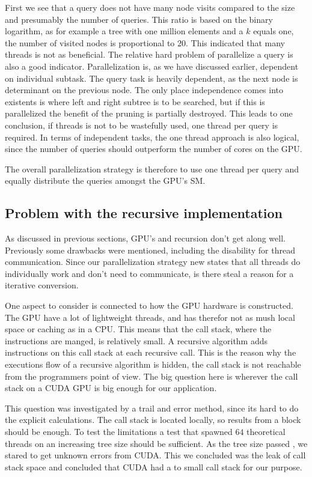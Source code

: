 First we see that a query does not have many node visits compared to the size and presumably the number of queries. This ratio is based on the binary logarithm, as for example a tree with one million elements and a $k$ equals one, the number of visited nodes is proportional to $20$. This indicated that many threads is not as beneficial. The relative hard problem of parallelize a query is also a good indicator. Parallelization is, as we have discussed earlier, dependent on individual subtask. The query task is heavily dependent, as the next node is determinant on the previous node. The only place independence comes into existents is where left and right subtree is to be searched, but if this is parallelized the benefit of the pruning is partially destroyed. This leads to one conclusion, if threads is not to be wastefully used, one thread per query is required. In terms of independent tasks, the one thread approach is also logical, since the number of queries should outperform the number of cores on the GPU\@.

The overall parallelization strategy is therefore to use one thread per query and equally distribute the queries amongst the GPU's SM\@.


\subsection{Problem with the recursive implementation} %
\label{sub:problem_with_the_recursive_implementation}

As discussed in previous sections, GPU's and recursion don't get along well. Previously some drawbacks were mentioned, including the disability for thread communication. Since our parallelization strategy new states that all threads do individually work and don't need to communicate, is there steal a reason for a iterative conversion.

One aspect to consider is connected to how the GPU hardware is constructed. The GPU have a lot of lightweight threads, and has therefor not as mush local space or caching as in a CPU\@. This means that the call stack, where the instructions are manged, is relatively small. A recursive algorithm adds instructions on this call stack at each recursive call. This is the reason why the executions flow of a recursive algorithm is hidden, the call stack is not reachable from the programmers point of view. The big question here is wherever the call stack on a CUDA GPU is big enough for our application.

This question was investigated by a trail and error method, since its hard to do the explicit calculations. The call stack is located locally, so results from a block should be enough. To test the limitations a test that spawned $64$ theoretical threads on an increasing tree size should be sufficient. As the tree size passed , we stared to get unknown errors from CUDA\@. This we concluded was the leak of call stack space and concluded that CUDA had a to small call stack for our purpose.


